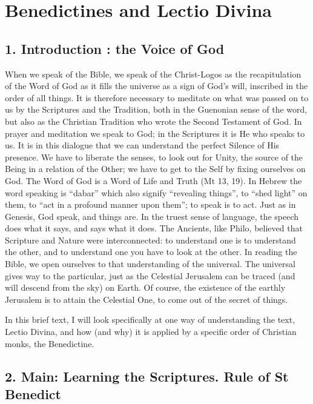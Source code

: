 \section{Benedictines and Lectio Divina}

\subsection*{1. Introduction : the Voice of God}

When we speak of the Bible, we speak of the Christ-Logos as the recapitulation of the Word of God as it fills the universe as a sign of God's will, inscribed in the order of all things. It is therefore necessary to meditate on what was passed on to us by the Scriptures and the Tradition, both in the Guenonian sense of the word, but also as the Christian Tradition who wrote the Second Testament of God. In prayer and meditation we speak to God; in the Scriptures it is He who speaks to us. It is in this dialogue that we can understand the perfect Silence of His presence. We have to liberate the senses, to look out for Unity, the source of the Being in a relation of the Other; we have to get to the Self by fixing ourselves on God. The Word of God is a Word of Life and Truth (Mt 13, 19). In Hebrew the word speaking is ``dabar” which also signify ``revealing things”, to ``shed light” on them, to ``act in a profound manner upon them”; to speak is to act. Just as in Genesis, God speak, and things are. In the truest sense of language, the speech does what it says, and says what it does. The Ancients, like Philo, believed that Scripture and Nature were interconnected: to understand one is to understand the other, and to understand one you have to look at the other. In reading the Bible, we open ourselves to that understanding of the universal. The universal gives way to the particular, just as the Celestial Jerusalem can be traced (and will descend from the sky) on Earth. Of course, the existence of the earthly Jerusalem is to attain the Celestial One, to come out of the secret of things.

In this brief text, I will look specifically at one way of understanding the text, Lectio Divina, and how (and why) it is applied by a specific order of Christian monks, the Benedictine.

\subsection*{2. Main: Learning the Scriptures. Rule of St Benedict}

